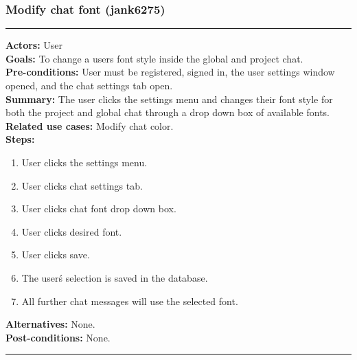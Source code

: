 \documentclass[11pt]{report}
\begin{document}
\subsubsection{Modify chat font (jank6275)}
\vspace{2pt}
\hrule
\vspace{8pt}
 \textbf{Actors:} User \\ 
 \textbf{Goals:} To change a users font style inside the global and project chat. \\
 \textbf{Pre-conditions:} User must be registered, signed in, the user settings window opened, and the chat settings tab open.  \\
 \textbf{Summary:} The user clicks the settings menu and changes their font style for both the project and global chat through a drop down box of available fonts. \\ 
 \textbf{Related use cases:} Modify chat color. \\ 
 \textbf{Steps:} \begin{enumerate}
  \item User clicks the settings menu.
  \item User clicks chat settings tab.
  \item User clicks chat font drop down box.
  \item User clicks desired font.
  \item User clicks save.
  \item The user\'s selection is saved in the database.
  \item All further chat messages will use the selected font.
 \end{enumerate}
 \textbf{Alternatives:} None. \\
 \textbf{Post-conditions:} None. \\
 \vspace{8pt}
\hrule
\newpage
\end{document}
